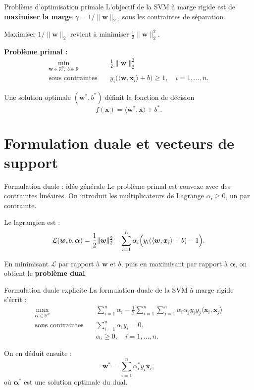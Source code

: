 \documentclass[aspectratio=169]{beamer}
\begin{document}
\begin{frame}{Problème d'optimisation primale}
  L'objectif de la SVM à marge rigide est de \textbf{maximiser la marge} $\gamma = 1/\|\bm{w}\|_2$,
  sous les contraintes de séparation.

  \vspace{0.3cm}
  Maximiser $1/\|\bm{w}\|_2$ revient à minimiser $\tfrac{1}{2}\|\bm{w}\|_2^2$.
  
  \vspace{0.3cm}
  \textbf{Problème primal :}
  \[
    \begin{aligned}
      \min_{\bm{w} \in \mathbb{R}^p,\; b \in \mathbb{R}} \quad & \frac{1}{2} \|\bm{w}\|_2^2 \\
      \text{sous contraintes} \quad & y_i \bigl( \langle \bm{w}, \bm{x}_i \rangle + b \bigr) \geq 1,
      \quad i = 1,\dots,n.
    \end{aligned}
  \]

  \vspace{0.3cm}
  Une solution optimale $(\bm{w}^\ast, b^\ast)$ définit la fonction de décision
  \[
    f(\bm{x}) = \langle \bm{w}^\ast, \bm{x} \rangle + b^\ast.
  \]
\end{frame}

\section{Formulation duale et vecteurs de support}

\begin{frame}{Formulation duale : idée générale}
  Le problème primal est convexe avec des contraintes linéaires.  
  On introduit les multiplicateurs de Lagrange $\alpha_i \geq 0$, un par contrainte.

  \vspace{0.3cm}
  Le lagrangien est :
  \[
    \mathcal{L}(\bm{w}, b, \bm{\alpha}) =
      \frac{1}{2} \|\bm{w}\|_2^2
      - \sum_{i=1}^n \alpha_i
      \Bigl( y_i (\langle \bm{w}, \bm{x}_i \rangle + b) - 1 \Bigr).
  \]

  En minimisant $\mathcal{L}$ par rapport à $\bm{w}$ et $b$, puis en maximisant par rapport à $\bm{\alpha}$,
  on obtient le \textbf{problème dual}.
\end{frame}

\begin{frame}{Formulation duale explicite}
  La formulation duale de la SVM à marge rigide s'écrit :
  \[
    \begin{aligned}
      \max_{\bm{\alpha} \in \mathbb{R}^n} \quad
      & \sum_{i=1}^n \alpha_i - \frac{1}{2}
        \sum_{i=1}^n \sum_{j=1}^n
        \alpha_i \alpha_j y_i y_j \langle \bm{x}_i, \bm{x}_j \rangle \\
      \text{sous contraintes} \quad
      & \sum_{i=1}^n \alpha_i y_i = 0, \\
      & \alpha_i \geq 0,\quad i=1,\dots,n.
    \end{aligned}
  \]

  \vspace{0.4cm}
  On en déduit ensuite :
  \[
    \bm{w}^\ast = \sum_{i=1}^n \alpha_i^\ast y_i \bm{x}_i,
  \]
  où $\bm{\alpha}^\ast$ est une solution optimale du dual.
\end{frame}
\end{document}
